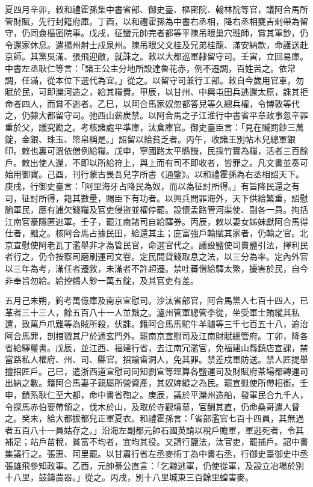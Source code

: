 \begin{pinyinscope}
 夏四月辛卯，敕和禮霍孫集中書省部、御史臺、樞密院、翰林院等官，議阿合馬所管財賦，先行封籍府庫。丁酉，以和禮霍孫為中書右丞相，降右丞相甕吉剌帶為留守，仍同僉樞密院事。戊戌，征蠻元帥完者都等平陳吊眼巢穴班師，賞其軍鈔，仍令還家休息。遣揚州射士戍泉州。陳吊眼父文桂及兄弟桂龍、滿安納款，命護送赴京師。其黨吳滿、張飛迎敵，就誅之。敕以大都巡軍隸留守司。壬寅，立回易庫。中書左丞耿仁等言：「諸王公主分地所設達魯花赤，例不遷調，百姓苦之。依常調，任滿，從本位下選代為宜。」從之。以留守司兼行工部。敕自今歲用官車，勿賦於民，可即灤河造之，給其糧費。甲辰，以甘州、中興屯田兵逃還太原，誅其拒命者四人，而賞不逃者。乙巳，以阿合馬家奴忽都答兒等久總兵權，令博敦等代之，仍隸大都留守司。弛西山薪炭禁。以阿合馬之子江淮行中書省平章政事忽辛罪重於父，議究勘之。考核諸處平準庫，汰倉庫官。御史臺臣言：「見在贓罰鈔三萬錠，金銀、珠玉、幣帛稱是。」詔留以給貧乏者。丙午，收諸王別帖木兒總軍銀印。敕也裏可溫依僧例給糧。戊申，寧國路太平縣饑，民採竹實為糧，活者三百餘戶。敕出使人還，不即以所給符上，與上而有司不即收者，皆罪之。凡文書並奏可始用御寶。己酉，刊行蒙古畏吾兒字所書《通鑒》。以和禮霍孫為右丞相詔天下。庚戌，行御史臺言：「阿里海牙占降民為奴，而以為征討所得。」有旨降民還之有司，征討所得，籍其數量，賜臣下有功者。以興兵問罪海外，天下供給繁重，詔慰諭軍民，應有逋欠錢糧及官吏侵盜並權停罷。設懷孟路管河渠使、副各一員。拘括江南官豪隱匿逃軍。壬子，罷江南諸司自給驛券。丙辰，敕以妻女姊妹獻阿合馬得仕者，黜之。核阿合馬占據民田，給還其主；庇富強戶輸賦其家者，仍輸之官。北京宣慰使阿老瓦丁濫舉非才為管民官，命選官代之。議設鹽使司賣鹽引法，擇利民者行之，仍令按察司磨刷運司文卷。定民間貸錢取息之法，以三分為率。定內外官以三年為考，滿任者遷敘，未滿者不許超遷。禁吐蕃僧給驛太繁，擾害於民，自今非奉旨勿給。給控鶴人鈔一萬五錠，及其官吏有差。



 五月己未朔，鉤考萬億庫及南京宣慰司。沙汰省部官，阿合馬黨人七百十四人，已革者三十三人，餘五百八十一人並黜之。瀘州管軍總管李從，坐受軍士賄縱其私還，致萬戶爪難等為賊所殺，伏誅。籍阿合馬馬駝牛羊驢等三千七百五十八，追治阿合馬罪，剖棺戮其尸於通玄門外。罷南京宣慰司及江南財賦總管府。丁卯，降各省給驛璽書。戊辰，並江西、福建行省，去江南冗濫官，免福建山縣鎮店宣課，禁當路私人權府、州、司、縣官。招諭畬洞人，免其罪。禁差戍軍防送。禁人匠提舉擅招匠戶。己巳，遣浙西道宣慰司同知劉宣等理算各鹽運司及財賦府茶場都轉運司出納之數。籍阿合馬妻子親屬所營資產，其奴婢縱之為民。罷宣慰使所帶相銜。壬申，鎖系耿仁至大都，命中書省鞫之。庚辰，議於平灤州造船，發軍民合九千人，令探馬赤伯要帶領之，伐木於山，及取於寺觀墳墓，官酬其直，仍命桑哥遣人督之。癸未，給大都拔都兒正軍夏衣。和禮霍孫言：「省部濫官七百十四員，其無過者五百八十一員姑存之。」沿海左副都元帥石國英請以稅戶贍軍，軍逃死者，令其補足；站戶苗稅，貧富不均者，宜均其役。又請行鹽法，汰官吏，罷捕戶。詔中書集議行之。張惠、阿里罷。以甘肅行省左丞麥術丁為中書右丞，行御史臺御史中丞張雄飛參知政事。乙酉，元帥綦公直言：「乞黥逃軍，仍使從軍，及設立冶場於別十八里，鼓鑄農器。」從之。丙戌，別十八里城東三百餘里蝗害麥。




\end{pinyinscope}
